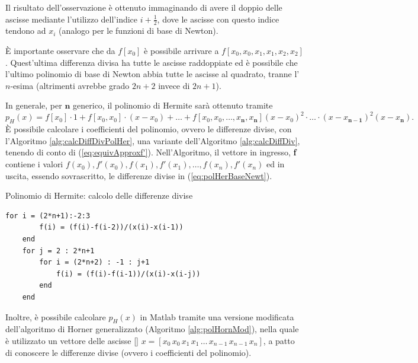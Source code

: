 Il risultato dell'osservazione è ottenuto immaginando di avere il doppio delle ascisse mediante l'utilizzo dell'indice $i+\frac{1}{2}$, dove le ascisse con questo indice tendono ad $x_i$ (analogo per le funzioni di base di Newton).
    
È importante osservare che da $f[x_0]$ è possibile arrivare a $f[x_0,x_0,x_1,x_1,x_2,x_2]$. Quest'ultima differenza divisa ha tutte le ascisse raddoppiate ed è possibile che l'ultimo polinomio di base di Newton abbia tutte le ascisse al quadrato, tranne l'$n$-esima (altrimenti avrebbe grado $2n+2$ invece di $2n+1$).

\begin{remark}
    In generale, per $\boldsymbol n$ generico, il polinomio di Hermite sarà ottenuto tramite 
    \begin{equation}\label{eq:polHerBaseNewt}
        p_H(x)=f[x_0]\cdot 1 + f[x_0,x_0]\cdot(x-x_0)+\hdots+f[x_0,x_0,\hdots,x_{\boldsymbol n},x_{\boldsymbol n}](x-x_0)^2\cdot\hdots\cdot(x-x_{\boldsymbol{n-1}})^2(x-x_{\boldsymbol n}).
    \end{equation}
    È possibile calcolare i coefficienti del polinomio, ovvero le differenze divise, con l'Algoritmo \ref{alg:calcDiffDivPolHer}, una variante dell'Algoritmo \ref{alg:calcDiffDiv}, tenendo di conto di (\ref{eq:equivApproxf'}). Nell'Algoritmo, il vettore in ingresso, \textbf{f} contiene i valori $f(x_0), f'(x_0), f(x_1), f'(x_1),\hdots, f(x_n),f'(x_n)$ ed in uscita, essendo sovrascritto, le differenze divise in (\ref{eq:polHerBaseNewt}).
\end{remark}
\begin{algorithm}
\caption{Polinomio di Hermite: calcolo delle differenze divise}\label{alg:calcDiffDivPolHer}
    \begin{lstlisting}[style=Matlab-editor]
    for i = (2*n+1):-2:3
        f(i) = (f(i)-f(i-2))/(x(i)-x(i-1))
    end
    for j = 2 : 2*n+1
        for i = (2*n+2) : -1 : j+1
            f(i) = (f(i)-f(i-1))/(x(i)-x(i-j))
        end
    end
    \end{lstlisting}
\end{algorithm}

Inoltre, è possibile calcolare $p_H(x)$ in Matlab tramite una versione modificata dell'algoritmo di Horner generalizzato (Algoritmo \ref{alg:polHornMod}), nella quale è utilizzato un vettore delle ascisse [\footnotemark] $x=[x_0\, x_0\, x_1\, x_1\, \hdots\, x_{n-1}\, x_{n-1}\,x_n]$, a patto di conoscere le differenze divise (ovvero i coefficienti del polinomio). 

